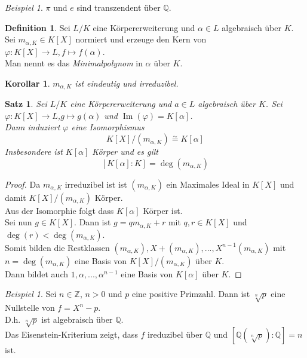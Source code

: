 \documentclass[10pt,a4paper]{article}
\newcommand{\Z}{\ensuremath{\mathbb{Z}}}
\newcommand{\Q}{\ensuremath{\mathbb{Q}}}
\newcommand{\al}{\ensuremath{\alpha}}
\newcommand{\isom}{\overset{\sim}{=}}
\newcommand{\Img}{\operatorname{Im}}
\theoremstyle{plain}
\newtheorem{kor}[theorem]{Korollar}
\newtheorem{satz}[theorem]{Satz}
\theoremstyle{definition}
\newtheorem{definition}[theorem]{Definition}
\theoremstyle{remark}
\newtheorem{exm}[theorem]{Beispiel}
\begin{document}
	\begin{exm}
		$\pi$ und $e$ sind transzendent über $\Q$.
	\end{exm}

	\begin{definition}
		Sei $L/K$ eine Körpererweiterung und $\al\in L$ algebraisch über $K$. Sei $m_{\al,K}\in K[X]$ normiert und erzeuge den Kern von $\varphi:K[X]\to L,f\mapsto f(\al)$.\\
		Man nennt es das \emph{Minimalpolynom} in $\al$ über $K$.
	\end{definition}

	\begin{kor}
		$m_{\al,K}$ ist eindeutig und irreduzibel.
	\end{kor}

	\begin{satz}
		Sei $L/K$ eine Körpererweiterung und $a\in L$ algebraisch über $K$. Sei $\varphi:K[X]\to L$,$g\mapsto g(\al)$ und $\Img(\varphi)=K[\al]$.\\
		Dann induziert $\varphi$ eine Isomorphismus
		\[K[X]/(m_{\al,K})\isom K[\al]\]
		Insbesondere ist $K[\al]$ Körper und es gilt
		\[[K[\al]:K]=\deg(m_{\al,K})\]
	\end{satz}

	\begin{proof}
		Da $m_{\al,K}$ irreduzibel ist ist $(m_{\al,K})$ ein Maximales Ideal in $K[X]$ und damit $K[X]/(m_{\al,K})$ Körper.\\
		Aus der Isomorphie folgt dass $K[\al]$ Körper ist.\\ %
		Sei nun $g\in K[X]$. Dann ist $g=qm_{\al,K}+r$ mit $q,r\in K[X]$ und $\deg(r)<\deg(m_{\al,K})$.\\
		Somit bilden die Restklassen $(m_{\al,K}),X+(m_{\al,K}),...,X^{n-1}(m_{\al,K})$ mit $n=\deg(m_{\al,K})$ eine Basis von $K[X]/(m_{\al,K})$ über $K$.\\
		Dann bildet auch $1,\al,...,\al^{n-1}$ eine Basis von $K[\al]$ über $K$.
	\end{proof}

	\begin{exm}
		Sei $n\in\Z$, $n>0$ und $p$ eine positive Primzahl. Dann ist $\sqrt[n]{p}$ eine Nullstelle von $f=X^n-p$.\\
		D.h. $\sqrt[n]{p}$ ist algebraisch über $\Q$.\\
		Das Eisenstein-Kriterium zeigt, dass $f$ ireduzibel über $\Q$ und $[\Q(\sqrt[n]{p}):\Q]=n$ ist.
	\end{exm}
\end{document}
